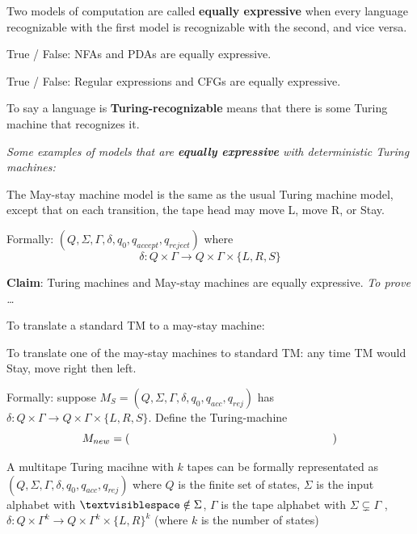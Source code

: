 \documentclass[12pt, oneside]{article}
\begin{document}
Two models of computation are called {\bf equally expressive} when 
every language recognizable with the first model is recognizable with the second, and vice versa.

True / False: NFAs and PDAs are equally expressive.

True / False: Regular expressions and CFGs are equally expressive.


To say a language is {\bf Turing-recognizable} means that there is some Turing machine that recognizes it.

\begin{center}
{\large \it  Some examples of models that are {\bf equally expressive} with deterministic Turing machines: }
\end{center}

\newpage
{}
The May-stay machine model is the same as the usual Turing machine model,  except that
on each transition, the tape head may move L, move R, or Stay. 

Formally: $(Q, \Sigma, \Gamma, \delta, q_0, q_{accept}, q_{reject})$ where 
\[
  \delta: Q \times \Gamma \to Q \times \Gamma \times \{L, R, S\}
\]

{\bf Claim}: Turing machines and May-stay machines are equally expressive. {\it To prove \ldots}

To translate a standard TM to a may-stay machine: 

\vspace{100pt}




To translate one  of the  may-stay machines to standard TM:
any time TM would Stay, move right  then  left.


Formally: suppose $M_S =  (Q, \Sigma, \Gamma, \delta, q_0, q_{acc}, q_{rej})$
has $\delta: Q \times \Gamma \to Q \times \Gamma \times \{L, R, S\}$. Define
the Turing-machine
\[
  M_{new} =  (\phantom{\hspace{2.5in}})
\]

\vfill


\vfill

\newpage

 A multitape Turing macihne with $k$ tapes
can be formally representated as 
$(Q, \Sigma,  \Gamma, \delta, q_0, q_{acc}, q_{rej})$ 
where $Q$ is the finite set of  states,
$\Sigma$ is the  input alphabet with  $\textvisiblespace \notin \Sigma$,
$\Gamma$  is the  tape alphabet with $\Sigma \subsetneq \Gamma$ ,
$\delta: Q\times \Gamma^k\to Q \times \Gamma^k \times \{L,R\}^k$ 
(where $k$ is  the number of  states)
\end{document}
